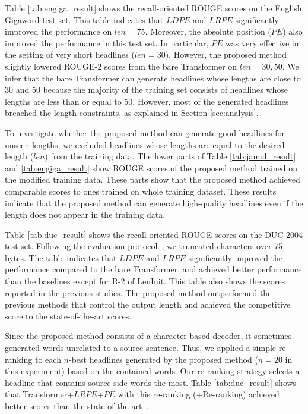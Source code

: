 \documentclass[11pt,a4paper]{article}
\begin{document}
Table \ref{tab:engiga_result} shows the recall-oriented ROUGE scores on the English Gigaword test set.
This table indicates that $LDPE$ and $LRPE$ significantly improved the performance on $len=75$.
Moreover, the absolute position ($PE$) also improved the performance in this test set.
In particular, $PE$ was very effective in the setting of very short headlines ($len=30$).
However, the proposed method slightly lowered ROUGE-2 scores from the bare Transformer on $len=30, 50$.
We infer that the bare Transformer can generate headlines whose lengths are close to 30 and 50 because the majority of the training set consists of headlines whose lengths are less than or equal to 50.
However, most of the generated headlines breached the length constraints, as explained in Section \ref{sec:analysis}.


To investigate whether the proposed method can generate good headlines for unseen lengths, we excluded headlines whose lengths are equal to the desired length ($len$) from the training data.
The lower parts of Table \ref{tab:jamul_result} and \ref{tab:engiga_result} show ROUGE scores of the proposed method trained on the modified training data.
These parts show that the proposed method achieved comparable scores to ones trained on whole training dataset.
These results indicate that the proposed method can generate high-quality headlines even if the length does not appear in the training data.



Table \ref{tab:duc_result} shows the recall-oriented ROUGE scores on the DUC-2004 test set.
Following the evaluation protocol~\cite{Over:2007:DC:1284916.1285157}, we truncated characters over 75 bytes.
The table indicates that $LDPE$ and $LRPE$ significantly improved the performance compared to the bare Transformer, and achieved better performance than the baselines except for R-2 of LenInit.
This table also shows the scores reported in the previous studies.
The proposed method outperformed the previous methods that control the output length and achieved the competitive score to the state-of-the-art scores.


Since the proposed method consists of a character-based decoder, it sometimes generated words unrelated to a source sentence.
Thus, we applied a simple re-ranking to each $n$-best headlines generated by the proposed method ($n=20$ in this experiment) based on the contained words.
Our re-ranking strategy selects a headline that contains source-side words the most.
Table \ref{tab:duc_result} shows that Transformer+$LRPE$+$PE$ with this re-ranking (+Re-ranking) achieved better scores than the state-of-the-art~\cite{suzuki-nagata:2017:EACLshort}.
\end{document}
